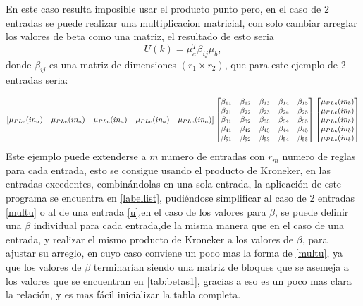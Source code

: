      En este caso resulta imposible usar el producto punto pero, en el caso de 2 entradas se puede realizar una multiplicacion matricial, con solo cambiar arreglar los valores de beta como una matriz, el resultado de esto seria \begin{equation}
     \label{multu}
     U(k)= \mu_{a}^{T} \beta_{ij} \mu_{b} ,
     \end{equation}  donde $\beta_{ij}$ es una matriz de dimensiones $(r_1 \times r_2)$, que para este ejemplo de 2 entradas seria:
     
    \begin{equation}
     \small{
    \begin{bmatrix}
    \mu_{PLe}(in_a) & \mu_{PLe}(in_a) & \mu_{PLe}(in_a) & \mu_{PLe}(in_a) & \mu_{PLe}(in_a)
    \end{bmatrix} } \begin{bmatrix}
   \beta_{11} &\beta_{12}  &\beta_{13}  &\beta_{14}  &\beta_{15}  \\ 
   \beta_{21} & \beta_{22} & \beta_{23} & \beta_{24} & \beta_{25} \\ 
   \beta_{31} &\beta_{32}  &\beta_{33}  &\beta_{34}  &\beta_{35}\\
   \beta_{41} &\beta_{42}  &\beta_{43}  &\beta_{44}  &\beta_{45}\\
   \beta_{51} &\beta_{52}  &\beta_{53}  &\beta_{54}  &\beta_{55}    \end{bmatrix}    \begin{bmatrix}
   \mu_{PLe}(in_b) \\ 
    \mu_{PLe}(in_b)\\ 
    \mu_{PLe}(in_b)\\ 
    \mu_{PLe}(in_b)\\ 
    \mu_{PLe}(in_b)
    \end{bmatrix}
    \end{equation}
    Este ejemplo puede extenderse a $m$ numero de entradas con $r_m$ numero de reglas para cada entrada, esto se consigue usando el producto de Kroneker,  en las entradas excedentes, combinándolas en una sola entrada, la aplicación de este programa se encuentra en \cref{labellist}, pudiéndose simplificar al caso de 2 entradas \ref{multu} o al de una entrada \ref{u},en el caso de los valores para $\beta$, se puede definir una $\beta$ individual para cada entrada,de la misma manera que en el caso de una entrada, y realizar el mismo producto de Kroneker a los valores de $\beta$, para ajustar su arreglo, en cuyo caso conviene un poco mas la forma de \cref{multu}, ya que los valores de $\beta$ terminarían siendo una matriz de bloques que se asemeja a los valores que se encuentran en \cref{tab:betas1}, gracias a eso es un poco mas clara la relación, y es mas fácil inicializar la tabla completa.
    
